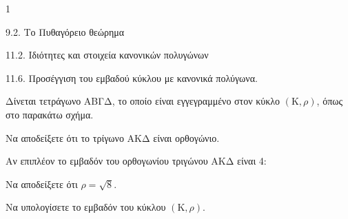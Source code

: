 \begin{ylh}{1}
    \item 9.2. Το Πυθαγόρειο θεώρημα
    \item 11.2. Ιδιότητες και στοιχεία κανονικών πολυγώνων
    \item 11.6. Προσέγγιση του εμβαδού κύκλου με κανονικά πολύγωνα.
\end{ylh}
\begin{figure}
\centering
{}
\end{figure}

Δίνεται τετράγωνο ΑΒΓΔ, το οποίο είναι εγγεγραμμένο στον κύκλο $(\text{K}, \rho)$, όπως στο παρακάτω σχήμα.

\begin{alist}
    \item Να αποδείξετε ότι το τρίγωνο ΑΚΔ είναι ορθογώνιο. 
    \item Αν επιπλέον το εμβαδόν του ορθογωνίου τριγώνου ΑΚΔ είναι 4:
    \begin{rlist}
        \item Να αποδείξετε ότι $\rho = \sqrt{8}$. 
        \item Να υπολογίσετε το εμβαδόν του κύκλου $(\text{K}, \rho)$. 
    \end{rlist}
\end{alist}